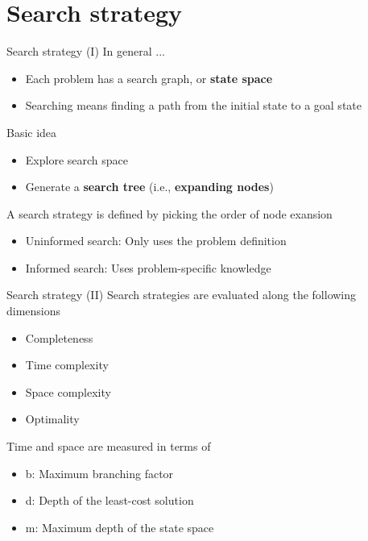 \documentclass[10pt,compress]{beamer} %
\begin{document}
\section{Search strategy}

\begin{frame}{Search strategy (I)}
    In general ...
	    \begin{itemize}
    	    \item Each problem has a search graph, or \textbf{state space}
        	\item Searching means finding a path from the initial state to a goal state
    	\end{itemize}

    Basic idea
        \begin{itemize}
            \item Explore search space
            \item Generate a \textbf{search tree} (i.e., \textbf{expanding nodes})
        \end{itemize}

    A search strategy is defined by picking the order of node exansion
        \begin{itemize}
            \item Uninformed search: Only uses the problem definition
            \item Informed search: Uses problem-specific knowledge
        \end{itemize}
\end{frame}

\begin{frame}{Search strategy (II)}
    Search strategies are evaluated along the following dimensions
	    \begin{itemize}
    	    \item Completeness
        	\item Time complexity
            \item Space complexity
            \item Optimality
    	\end{itemize}

    Time and space are measured in terms of 
        \begin{itemize}
            \item b: Maximum branching factor
            \item d: Depth of the least-cost solution
            \item m: Maximum depth of the state space
        \end{itemize}
\end{frame}
\end{document}
